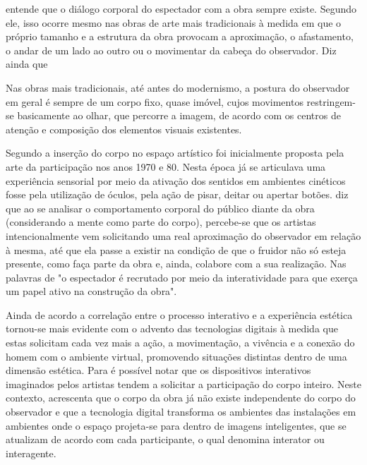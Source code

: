  entende que o diálogo corporal do espectador com a obra sempre existe. Segundo ele, isso ocorre mesmo nas obras de arte mais tradicionais à medida em que o próprio tamanho e a estrutura da obra provocam a aproximação, o afastamento, o andar de um lado ao outro ou o movimentar da cabeça do observador. Diz ainda que

\begin{citacao}
Nas obras mais tradicionais, até antes do modernismo, a postura do observador em geral é sempre de um corpo fixo, quase imóvel, cujos movimentos restringem-se basicamente ao olhar, que percorre a imagem, de acordo com os centros de atenção e composição dos elementos visuais existentes. \cite[p. 1585]{sogabe} 
\end{citacao}

Segundo  a inserção do corpo no espaço artístico foi inicialmente proposta pela arte da participação nos anos 1970 e 80. Nesta época já se articulava uma experiência sensorial por meio da ativação dos sentidos em ambientes cinéticos fosse pela utilização de óculos, pela ação de pisar, deitar ou apertar botões.  diz que ao se analisar o comportamento corporal do público diante da obra (considerando a mente como parte do corpo), percebe-se que os artistas intencionalmente vem solicitando uma real aproximação do observador em relação à mesma, até que ela passe a existir na condição de que o fruidor não só esteja presente, como faça parte da obra e, ainda, colabore com a sua realização. Nas palavras de  "o espectador é recrutado por meio da interatividade para que exerça um papel ativo na construção da obra".

Ainda de acordo  a correlação entre o processo interativo e a experiência estética tornou-se mais evidente com o advento das tecnologias digitais à medida que estas solicitam cada vez mais a ação, a movimentação, a vivência e a conexão do homem com o ambiente virtual, promovendo situações distintas dentro de uma dimensão estética. Para  é possível notar que os dispositivos interativos imaginados pelos artistas tendem a solicitar a participação do corpo inteiro. Neste contexto,  acrescenta que o corpo da obra já não existe independente do corpo do observador e que a tecnologia digital transforma os ambientes das instalações em ambientes onde o espaço projeta-se para dentro de imagens inteligentes, que se atualizam de acordo com cada participante, o qual denomina interator ou interagente.

